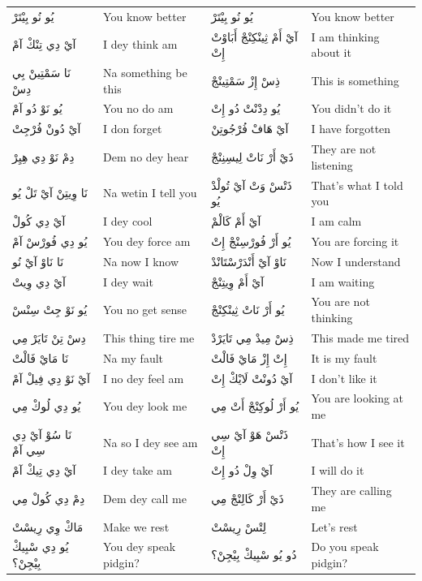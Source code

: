 \documentclass[12pt]{article}
\begin{document}
\begin{longtable}{p{3.2cm} p{3.2cm} p{3.2cm} p{3.2cm}}
يُو نُو بِيْتَرْ & You know better & يُو نُو بِيْتَرْ & You know better \\
آيْ دِي تِنْكْ آمْ & I dey think am & آيْ أَمْ ثِينْكِنْجْ أَبَاوْتْ إِتْ & I am thinking about it \\
نَا سَمْتِينْ بِي دِسْ & Na something be this & ذِسْ إِزْ سَمْتِينْجْ & This is something \\
يُو نَوْ دُو آمْ & You no do am & يُو دِدْنْتْ دُو إِتْ & You didn’t do it \\
آيْ دُونْ فُرْجِتْ & I don forget & آيْ هَافْ فُرْجُوتِنْ & I have forgotten \\
دِمْ نَوْ دِي هِيِرْ & Dem no dey hear & ذَيْ أَرْ نَاتْ لِيسِنِنْجْ & They are not listening \\
نَا وِيتِنْ آيْ تَلْ يُو & Na wetin I tell you & ذَتْسْ وَتْ آيْ تُولْدْ يُو & That’s what I told you \\
آيْ دِي كُولْ & I dey cool & آيْ أَمْ كَالْمْ & I am calm \\
يُو دِي فُورْسْ آمْ & You dey force am & يُو أَرْ فُورْسِنْجْ إِتْ & You are forcing it \\
نَا نَاوْ آيْ نُو & Na now I know & نَاوْ آيْ أَنْدَرْسْتَانْدْ & Now I understand \\
آيْ دِي وِيتْ & I dey wait & آيْ أَمْ وِيتِنْجْ & I am waiting \\
يُو نَوْ جِتْ سِنْسْ & You no get sense & يُو أَرْ نَاتْ ثِينْكِنْجْ & You are not thinking \\
دِسْ تِنْ تَايَرْ مِي & This thing tire me & ذِسْ مِيدْ مِي تَايَرْدْ & This made me tired \\
نَا مَايْ فَالْتْ & Na my fault & إِتْ إِزْ مَايْ فَالْتْ & It is my fault \\
آيْ نَوْ دِي فِيلْ آمْ & I no dey feel am & آيْ دُونْتْ لَايْكْ إِتْ & I don’t like it \\
يُو دِي لُوكْ مِي & You dey look me & يُو أَرْ لُوكِنْجْ أَتْ مِي & You are looking at me \\
نَا سُوْ آيْ دِي سِي آمْ & Na so I dey see am & ذَتْسْ هَوْ آيْ سِي إِتْ & That’s how I see it \\
آيْ دِي تِيكْ آمْ & I dey take am & آيْ وِلْ دُو إِتْ & I will do it \\
دِمْ دِي كُولْ مِي & Dem dey call me & ذَيْ أَرْ كَالِنْجْ مِي & They are calling me \\
مَاكْ وِي رِيسْتْ & Make we rest & لِتْسْ رِيسْتْ & Let’s rest \\
يُو دِي سْبِيكْ بِيْجِنْ؟ & You dey speak pidgin? & دُو يُو سْبِيكْ بِيْجِنْ؟ & Do you speak pidgin? \\

\end{longtable}
\end{document}
